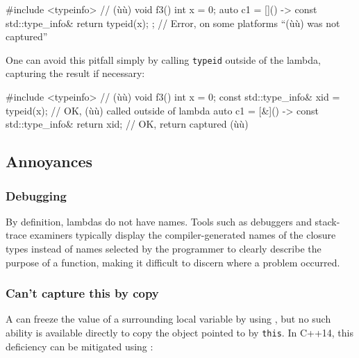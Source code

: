 \begin{emcppslisting}
#include <typeinfo>  // (ù{}ù)
void f3()
{
    int x = 0;
    auto c1 = []() -> const std::type_info& { return typeid(x); };
        // Error, on some platforms ``(ù{}ù) was not captured''
}
\end{emcppslisting}
    

One can avoid this pitfall simply by calling \lstinline!typeid! outside of
the lambda, capturing the result if necessary:

\begin{emcppslisting}
#include <typeinfo>  // (ù{}ù)
void f3()
{
    int x = 0;
    const std::type_info& xid = typeid(x);
        // OK, (ù{}ù) called outside of lambda
    auto c1 = [&]() -> const std::type_info& { return xid; }
        // OK, return captured (ù{}ù)
}
\end{emcppslisting}
    

\subsection[Annoyances]{Annoyances}\label{annoyances}

\subsubsection[Debugging]{Debugging}\label{debugging}

By definition, lambdas do not have names. Tools such as debuggers and
stack-trace examiners typically display the compiler-generated names of
the closure types instead of names selected by the programmer to clearly
describe the purpose of a function, making it difficult to discern where
a problem occurred.

\subsubsection[Can’t capture \lstinline!*this! by copy]{Can’t capture {\SubsubsecCode *this} by copy}\label{can’t-capture-*this-by-copy}

A  can freeze the value of a surrounding local
variable by using , but no such ability is
available directly to copy the object pointed to by \lstinline!this!. In
C++14, this deficiency can be mitigated using :

